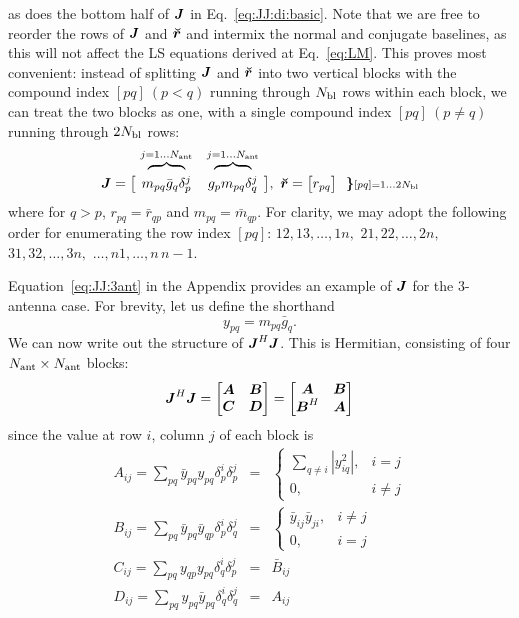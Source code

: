 \documentclass[useAMS,usenatbib]{mn2e}
\makeatletter
\newcommand{\mat}[1]{{\bmath{#1}}}
\newcommand{\JJ}{\mat{J}} %
\newcommand{\Matrix}[2]{\left [ \begin{array}{@{}#1@{}}#2\end{array} \right ]}
\newcommand{\AUG}[1]{\bmath{\breve{#1}}}
\newcommand{\Rr}{\AUG{r}}
\numberwithin{equation}{section}
\makeatother
\begin{document}
as does the bottom half of $\JJ$ in Eq.~\ref{eq:JJ:di:basic}. Note that we are free to reorder the rows of $\JJ$ and $\Rr$ 
and intermix the normal and conjugate baselines, as this will not affect the LS equations derived at Eq.~\ref{eq:LM}.
This proves most convenient: instead of splitting $\JJ$ and $\Rr$ into 
two vertical blocks with the compound index $[pq]~(p<q)$ running through $N_\mathrm{bl}$ rows within each block, we can treat 
the two blocks as one, with a single compound index $[pq]~(p\ne q)$ running through $2N_\mathrm{bl}$ rows:
\begin{equation}
\label{eq:JJ:di}
\begin{array}{r@{~}cc@{~}cc}
                & \overbrace{~~~~~~~~}^{j=1\dots \Na} & \overbrace{~~~~~~~~}^{j=1\dots \Na} \\
\JJ = \big [ & m_{pq}\bar{g}_q\delta^{j}_p & g_p m_{pq} \delta^{j}_q & \big ],~
\Rr = \big [ r_{pq} \big ] ~~{%
\bm{\}} \scriptstyle [pq]=1\dots 2\Nbl}
\end{array}
\end{equation}
where for $q>p$, $r_{pq}=\bar{r}_{qp}$ and $m_{pq}=\bar{m}_{qp}$. For clarity, we may adopt the 
following order for enumerating the row index $[pq]$: $12,13,\dots,1n,$ $21,22,\dots,2n,$ $31,32,\dots,3n,$ $\dots,n1,\dots,n\,n-1$. 

Equation~\ref{eq:JJ:3ant} in the Appendix provides an example of $\JJ$ for the 3-antenna case. For
brevity, let us define the shorthand 
\begin{equation}
y_{pq} = m_{pq} \bar{g}_q. 
\end{equation}
We can now write out the 
structure of $\JJ^H\JJ$. This is Hermitian, consisting of four $N_\mathrm{ant}\times N_\mathrm{ant}$ blocks:
\begin{equation}
\label{eq:JHJ:DI:ABCD}
\JJ^H\JJ = \Matrix{cc}{\mat{A}&\mat{B}\\\mat{C}&\mat{D}} = \Matrix{cc}{\mat{A}&\mat{B}\\\mat{B}^H&\mat{A}}
\end{equation}
since the value at row $i$, column $j$ of each block is
\begin{eqnarray}
A_{ij} = \sum_{pq} \bar{y}_{pq} y_{pq} \delta^{i}_p \delta^{j}_p &=& 
  \left \{ \begin{array}{cc}
        \sum\limits_{q\ne i} |y_{iq}^2|, & \scriptstyle i=j \\
        0,  & \scriptstyle  i\ne j
  \end{array} \right .\nonumber\\ 
B_{ij} = \sum_{pq} \bar{y}_{pq} \bar{y}_{qp} \delta^{i}_p \delta^{j}_q &=& 
  \left \{ \begin{array}{cc}
      \bar{y}_{ij} \bar{y}_{ji}, & \scriptstyle i\ne j\\
      0, & \scriptstyle i=j
  \end{array} \right .\nonumber\\ 
C_{ij} = \sum_{pq} y_{qp} y_{pq} \delta^{i}_q \delta^{j}_p &=& 
  \bar{B}_{ij} \nonumber\\
D_{ij} = \sum_{pq} y_{pq} \bar{y}_{pq} \delta^{i}_q \delta^{j}_q &=& A_{ij} 
\label{eq:JHJ:DI:ABCD1}
\end{eqnarray}
\end{document}
